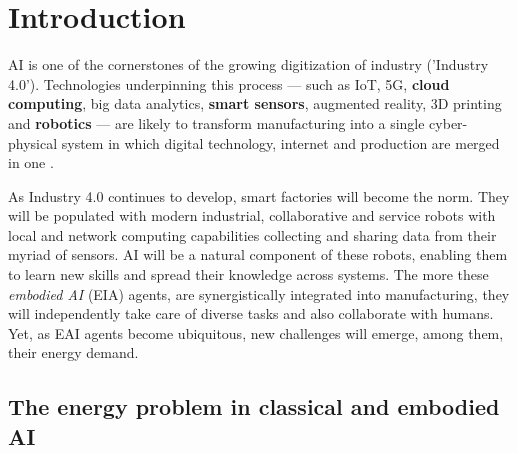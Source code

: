\section{Introduction}\label{sec:intro}
\begin{fancyquotes}
	AI is one of the cornerstones of the growing digitization of industry ('Industry 4.0'). Technologies underpinning  this  process  ---  such as IoT,  5G,  \textbf{cloud  computing},  big  data  analytics,  \textbf{smart  sensors},  augmented  reality,  3D  printing  and  \textbf{robotics}  ---  are  likely  to  transform  manufacturing  into  a  single cyber-physical  system  in which digital  technology,  internet  and  production  are merged in one \cite{szczepanski_2019}.
\end{fancyquotes}
As Industry 4.0 continues to develop, smart factories will become the norm. They will be populated with modern industrial, collaborative and service robots with local and network computing capabilities collecting and sharing data from their myriad of sensors. %
AI will be a natural component of these robots, enabling them to learn new skills and spread their knowledge across systems. The more these \emph{embodied AI} (EIA) agents, are synergistically integrated into manufacturing, they will independently take care of diverse tasks and also collaborate with humans. Yet, as EAI agents become ubiquitous, new challenges will emerge, among them, their energy demand.

\subsection{The energy problem in classical and embodied AI}

